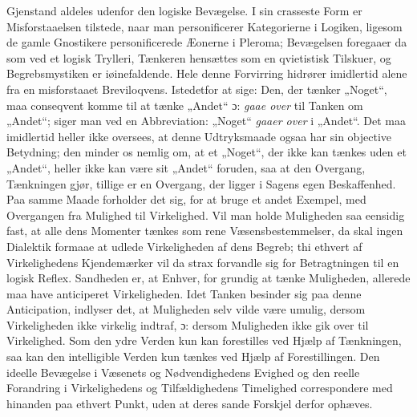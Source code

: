 \documentclass[12pt]{book}
\newcommand{\dsi}{\textup{ɔ:}}
\newcommand{\opage}[1]{\marginnote{\footnotesize\textit{[#1]}}}
\begin{document}
Gjenstand aldeles udenfor den logiske Bevægelse. I sin crasseste Form er Misforstaaelsen
tilstede, naar man personificerer Kategorierne i Logiken, ligesom de gamle Gnostikere
personificerede Æonerne i Pleroma; Bevægelsen foregaaer da som ved et logisk Trylleri, Tænkeren
hensættes som en qvietistisk Tilskuer, og Begrebsmystiken er iøinefaldende. Hele denne
Forvirring hidrører imidlertid alene fra en misforstaaet Breviloqvens. Istedetfor at sige: Den,
der tænker „Noget“, maa conseqvent komme til at tænke „Andet“ \dsi{} \emph{gaae over} til
Tanken om „Andet“; siger man ved en Abbreviation: „Noget“ \emph{gaaer over} i „Andet“. Det maa
imidlertid heller ikke oversees, at denne Udtryksmaade ogsaa har sin objective Betydning; den
minder os nemlig om, at et „Noget“, der ikke kan tænkes uden et „Andet“, heller ikke kan være
sit „Andet“ foruden, saa at den Overgang, Tænkningen gjør, tillige er en Overgang, der ligger i
Sagens egen Beskaffenhed. Paa samme Maade forholder det sig, for at bruge et andet Exempel, med
Overgangen fra Mulighed til Virkelighed. Vil man holde Muligheden saa eensidig fast, at alle
dens Momenter tænkes som rene Væsensbestemmelser, da skal ingen Dialektik formaae at udlede
Virkeligheden af dens Begreb; thi ethvert af Virkelighedens Kjendemærker vil da strax forvandle
sig for Betragtningen til en logisk Reflex. Sandheden er, at Enhver, for grundig at tænke
Muligheden, allerede maa have anticiperet Virkeligheden. Idet Tanken besinder sig paa denne
Anticipation, indlyser det, at Muligheden selv vilde være umulig, dersom Virkeligheden ikke
virkelig indtraf, \dsi{} dersom Muligheden ikke gik over til Virkelighed. Som den ydre Verden
kun kan forestilles ved Hjælp af Tænkningen, saa kan den intelligible Verden kun tænkes ved
Hjælp af Forestillingen. Den ideelle Bevægelse i Væsenets
\opage{109} %
og Nødvendighedens Evighed og den reelle Forandring i Virkelighedens og
Tilfældighedens Timelighed correspondere med hinanden paa ethvert Punkt, uden at
deres sande Forskjel derfor ophæves.
\end{document}
